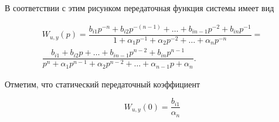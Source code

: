 В соответствии с этим рисунком передаточная функция системы имеет вид

\begin{multline}
	W_{u,y}(p) = \dfrac{b_{i1}p^{-n}+b_{i2}p^{-(n-1)}+\dots+b_{in-1}p^{-2}+b_{in}p^{-1}}{1+\alpha_1p^{-1}+\alpha_2p^{-2}+\dots+\alpha_np^{-n}} = \\
	\dfrac{b_{i1}+b_{i2}p+\dots+b_{in-1}p^{n-2}+b_{in}p^{n-1}}{p^n+\alpha_1p^{n-1}+\alpha_2p^{n-2}+\dots+\alpha_{n-1}p+\alpha_n}.
\end{multline}

Отметим, что статический передаточный коэффициент

\begin{equation}
	W_{u,y}(0)=\dfrac{b_{i1}}{\alpha_n}
\end{equation}

\newpage